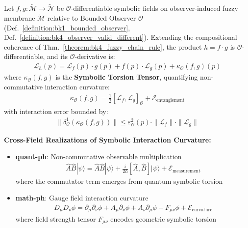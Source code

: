 \begin{theorem}
\label{theorem:bk4_fuzzy_product_rule}
Let $f, g: \tilde{\mathcal{M}} \rightarrow \tilde{\mathcal{N}}$ be $\mathcal{O}$-differentiable symbolic fields on observer-induced fuzzy membrane $\tilde{\mathcal{M}}$ relative to Bounded Observer $\mathcal{O}$ (Def.~\ref{definition:bk1_bounded_observer}, Def.~\ref{definition:bk4_observer_valid_different}). Extending the compositional coherence of Thm.~\ref{theorem:bk4_fuzzy_chain_rule}, the product $h = f \cdot g$ is $\mathcal{O}$-differentiable, and its $\mathcal{O}$-derivative is:
\begin{align}
\mathcal{L}_h(p) = \mathcal{L}_f(p) \cdot g(p) + f(p) \cdot \mathcal{L}_g(p) + \kappa_{\mathcal{O}}(f, g)(p)
\end{align}
where $\kappa_{\mathcal{O}}(f, g)$ is the \textbf{Symbolic Torsion Tensor}, quantifying non-commutative interaction curvature:
\begin{align}
\kappa_{\mathcal{O}}(f, g) = \frac{1}{2}[\mathcal{L}_f, \mathcal{L}_g]_{\mathcal{O}} + \mathcal{E}_{\text{entanglement}}
\end{align}
with interaction error bounded by:
\begin{align}
\|\delta^1_{\mathcal{O}}(\kappa_{\mathcal{O}}(f, g))\| \leq \varepsilon_{\mathcal{O}}^2(p) \cdot \|\mathcal{L}_f\| \cdot \|\mathcal{L}_g\|
\end{align}

\textbf{Cross-Field Realizations of Symbolic Interaction Curvature:}

\begin{itemize}
\item \textbf{quant-ph}: Non-commutative observable multiplication
  \begin{align}
  \hat{A} \hat{B} |\psi\rangle = \hat{A}\hat{B} |\psi\rangle + \frac{i}{2\hbar}[\hat{A}, \hat{B}] |\psi\rangle + \mathcal{E}_{\text{measurement}}
  \end{align}
  where the commutator term emerges from quantum symbolic torsion
  
\item \textbf{math-ph}: Gauge field interaction curvature
  \begin{align}
  D_\mu D_\nu \phi = \partial_\mu \partial_\nu \phi + A_\mu \partial_\nu \phi + A_\nu \partial_\mu \phi + F_{\mu\nu} \phi + \mathcal{E}_{\text{curvature}}
  \end{align}
  where field strength tensor $F_{\mu\nu}$ encodes geometric symbolic torsion
  

\end{itemize}
\end{theorem}
